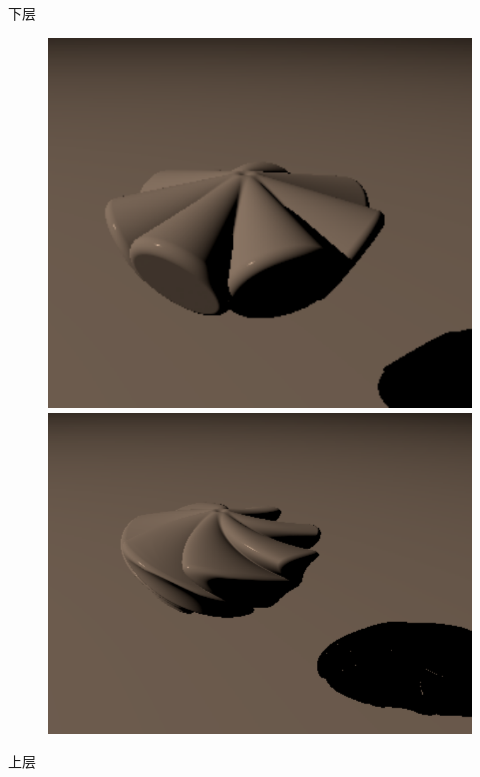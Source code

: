 \documentclass[aspectratio=169]{ctexbeamer} %
\begin{document}
\begin{frame}
\begin{block}{下层}
\begin{figure}[htbp]
            \includegraphics[height=.3\textheight]{images/pre/head/cream1-3.pdf}
            \includegraphics[height=.3\textheight]{images/pre/head/cream1-4.pdf}
            \caption{}
            \label{fig:lower_cream}
        \end{figure}
    \end{block}
    \begin{block}{上层}
        \begin{figure}[htbp]
            \centering

\end{figure}
\end{block}
\end{frame}
\end{document}
